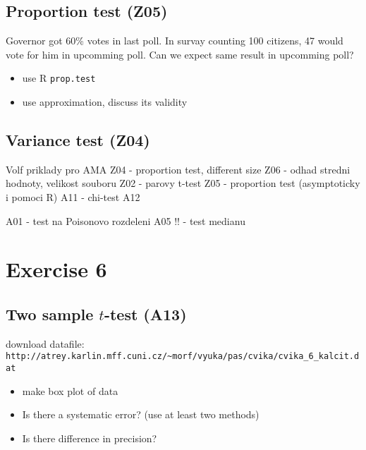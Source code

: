 \documentclass[4pt]{article}
\def\answer#1{{\color{red} #1}}
\begin{document}
\subsection{Proportion test (Z05)}
Governor got 60\% votes in last poll. In survay counting 100 citizens,
47 would vote for him in upcomming poll. Can we expect same result in upcomming poll?
\begin{itemize}
 \item use R \verb'prop.test'
 \item use approximation, discuss its validity
\end{itemize}


\subsection{Variance test (Z04)}
Volf priklady pro AMA
Z04 - proportion test, different size
Z06 - odhad stredni hodnoty, velikost souboru
Z02 - parovy t-test
Z05 - proportion test (asymptoticky i pomoci R)
A11 - chi-test
A12 

A01 - test na Poisonovo rozdeleni
A05 !! - test medianu

\pagebreak

\noindent
\pagebreak


\section{Exercise 6}

\subsection{Two sample $t$-test (A13)}
download datafile: \verb'http://atrey.karlin.mff.cuni.cz/~morf/vyuka/pas/cvika/cvika_6_kalcit.dat'

\begin{itemize}
 \item make box plot of data
 \item Is there a systematic error?  (use at least two methods)
 \item Is there difference in precision?
\end{itemize}

\end{document}
